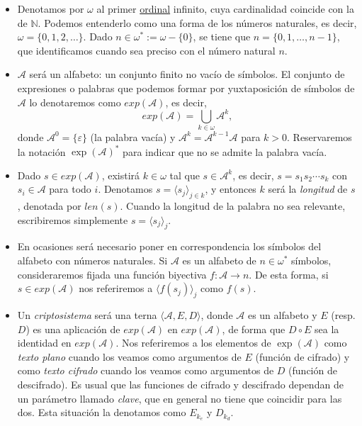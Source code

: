 \documentclass[
  a4paper,
  spanish,
  12pt,
]{scrartcl}
\theoremstyle{ejercicio-style}
\theoremstyle{remark-style}
\theoremstyle{teorema-style}
\begin{document}
\begin{itemize}
\item Denotamos por $\omega$ al primer \href{https://en.wikipedia.org/wiki/Ordinal_number}{ordinal} infinito, cuya cardinalidad coincide con la de $\mathbb{N}$. Podemos entenderlo como una forma de  los números naturales, es decir, $\omega = \{0,1,2, \dots \}$. Dado $n \in \omega^\ast := \omega - \{0\}$, se tiene que $n = \{0, 1, \dots, n-1\}$, que identificamos cuando sea preciso con el número natural $n$.
\item $\mathcal{A}$ será un alfabeto: un conjunto finito no vacío de símbolos. El conjunto de expresiones o palabras que podemos formar por yuxtaposición de símbolos de $\mathcal{A}$ lo denotaremos como $exp(\mathcal{A})$, es decir, \[ exp(\mathcal{A}) = \bigcup_{k \in \omega} \mathcal{A}^k,\] donde $\mathcal{A}^0 = \{\varepsilon\}$ (la palabra vacía) y $\mathcal{A}^k = \mathcal{A}^{k-1}\mathcal{A}$ para $k > 0$. Reservaremos la notación $\exp(\mathcal{A})^\ast$ para indicar que no se admite la palabra vacía.
\item Dado $s \in exp(\mathcal{A})$, existirá $k \in \omega$ tal que $s \in \mathcal{A}^k$, es decir, $s = s_1s_2\cdots s_k$ con $s_i \in \mathcal{A}$ para todo $i$. Denotamos $s = \langle s_j \rangle_{j \in k}$, y entonces $k$ será la \textit{longitud} de $s$, denotada por $len(s)$. Cuando la longitud de la palabra no sea relevante, escribiremos simplemente $s = \langle s_j \rangle_{j}$.
\item En ocasiones será necesario poner en correspondencia los símbolos del alfabeto con números naturales. Si $\mathcal{A}$ es un alfabeto de $n \in \omega^\ast$ símbolos, consideraremos fijada una función biyectiva $f: \mathcal{A} \to n$. De esta forma, si $s \in exp(\mathcal{A})$ nos referiremos a $\langle f(s_j) \rangle_j$ como $f(s)$.
\item Un \textit{criptosistema} será una terna $\langle \mathcal{A}, E, D \rangle$, donde $\mathcal{A}$ es un alfabeto y $E$ (resp. $D$) es una aplicación de $exp(\mathcal{A})$ en $exp(\mathcal{A})$, de forma que $D \circ E$ sea la identidad en $exp(\mathcal{A})$. Nos referiremos a los elementos de $\exp(\mathcal{A})$ como \textit{texto plano} cuando los veamos como argumentos de $E$ (función de cifrado) y como \textit{texto cifrado} cuando los veamos como argumentos de $D$ (función de descifrado). Es usual que las funciones de cifrado y descifrado dependan de un parámetro llamado \textit{clave}, que en general no tiene que coincidir para las dos. Esta situación la denotamos como $E_{k_e}$ y $D_{k_d}$.
\end{itemize}
\end{document}
